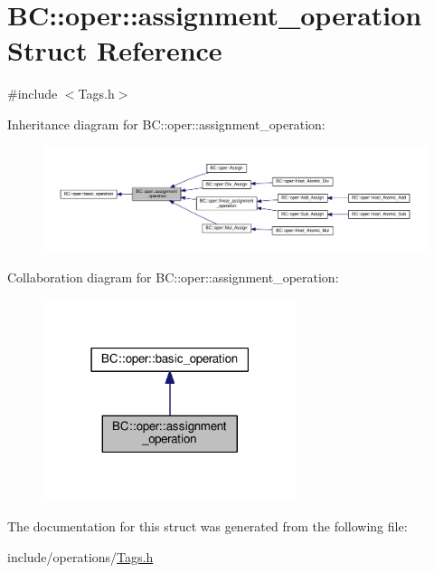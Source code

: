 \hypertarget{structBC_1_1oper_1_1assignment__operation}{}\section{BC\+:\+:oper\+:\+:assignment\+\_\+operation Struct Reference}
\label{structBC_1_1oper_1_1assignment__operation}


{\ttfamily \#include $<$Tags.\+h$>$}



Inheritance diagram for BC\+:\+:oper\+:\+:assignment\+\_\+operation\+:
\nopagebreak
\begin{figure}[H]
\begin{center}
\leavevmode
\includegraphics[width=350pt]{structBC_1_1oper_1_1assignment__operation__inherit__graph}
\end{center}
\end{figure}


Collaboration diagram for BC\+:\+:oper\+:\+:assignment\+\_\+operation\+:
\nopagebreak
\begin{figure}[H]
\begin{center}
\leavevmode
\includegraphics[width=210pt]{structBC_1_1oper_1_1assignment__operation__coll__graph}
\end{center}
\end{figure}


The documentation for this struct was generated from the following file\+:\begin{DoxyCompactItemize}
\item 
include/operations/\hyperlink{operations_2Tags_8h}{Tags.\+h}\end{DoxyCompactItemize}
